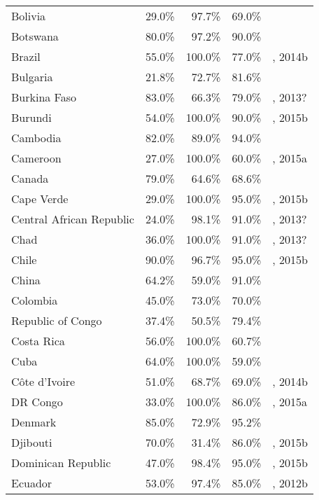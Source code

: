 \begin{longtable}{lrrrl}
  Bolivia & 29.0\% & 97.7\% & 69.0\% & \cite{Unaids2016-an} \\
  Botswana & 80.0\% & 97.2\% & 90.0\% & \cite{Unaids2016-an} \\
  Brazil & 55.0\% & 100.0\% & 77.0\% & \cite{Unaids2016-an}, 2014b \\
  Bulgaria & 21.8\% & 72.7\% & 81.6\% & \cite{Unaids2016-an, Unaids2016-am}\\
  Burkina Faso & 83.0\% & 66.3\% & 79.0\% & \cite{Unaids2016-an}, 2013? \\
  Burundi & 54.0\% & 100.0\% & 90.0\% & \cite{Unaids2016-an}, 2015b \\
  Cambodia & 82.0\% & 89.0\% & 94.0\% & \cite{Unaids2016-an} \\
  Cameroon & 27.0\% & 100.0\% & 60.0\% & \cite{Unaids2016-an}, 2015a \\
  Canada & 79.0\% & 64.6\% & 68.6\% & \cite{catie2014a,catie2014b} \\
  Cape Verde & 29.0\% & 100.0\% & 95.0\% & \cite{Unaids2016-an}, 2015b \\
  Central African Republic & 24.0\% & 98.1\% & 91.0\% & \cite{Unaids2016-an}, 2013? \\
  Chad & 36.0\% & 100.0\% & 91.0\% & \cite{Unaids2016-an}, 2013? \\
  Chile & 90.0\% & 96.7\% & 95.0\% & \cite{Unaids2016-an}, 2015b \\
  China & 64.2\% & 59.0\% & 91.0\% & \cite{Unaids2016-an, AIDSdatahub-fg, avert2013} \\
  Colombia & 45.0\% & 73.0\% & 70.0\% & \cite{ecdc2014} \\
  Republic of Congo & 37.4\% & 50.5\% & 79.4\% & \cite{Unaids2016-am} \\
  Costa Rica & 56.0\% & 100.0\% & 60.7\% & \cite{Unaids2016-an} \\
  Cuba & 64.0\% & 100.0\% & 59.0\% & \cite{Unaids2016-an} \\
  Côte d'Ivoire & 51.0\% & 68.7\% & 69.0\% & \cite{Unaids2016-an}, 2014b \\
  DR Congo & 33.0\% & 100.0\% & 86.0\% & \cite{Unaids2016-an}, 2015a \\
  Denmark & 85.0\% & 72.9\% & 95.2\% & \cite{aid2014} \\
  Djibouti & 70.0\% & 31.4\% & 86.0\% & \cite{Unaids2016-an}, 2015b \\
  Dominican Republic & 47.0\% & 98.4\% & 95.0\% & \cite{Unaids2016-an}, 2015b \\
  Ecuador & 53.0\% & 97.4\% & 85.0\% & \cite{Unaids2016-an}, 2012b \\

\end{longtable}
